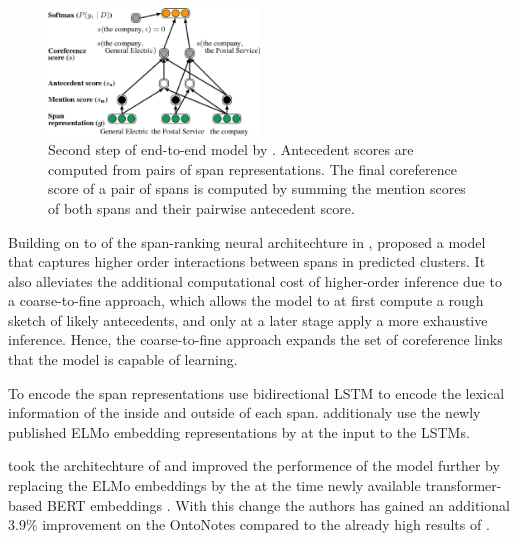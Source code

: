 \documentclass[11pt]{article}
\begin{document}
\begin{figure} %
    \centering
      \includegraphics[width=0.5\textwidth]{e2e_extra_info.eps}
  \caption{Second step of end-to-end model by \textcite{lee2017end}. Antecedent scores are computed from pairs of span representations. The final coreference score of a pair of spans is computed by summing the mention scores of both spans and their pairwise antecedent score.  }
  \label{fig:e2e_extra_infol}
\end{figure}

Building on to of the span-ranking neural architechture in \textcite{lee2017end}, \textcite{lee2018higher} proposed a model that captures higher order interactions
between spans in predicted clusters. It also alleviates the additional computational cost of higher-order inference due to a coarse-to-fine approach, which allows the model to at first compute a rough sketch of likely antecedents, and only at a later stage apply a more exhaustive inference. Hence, the coarse-to-fine approach expands the set of coreference links that the model is capable of learning. 

To encode the span representations \textcite{lee2017end} use bidirectional LSTM \parencite{lstm} to encode the lexical information of the inside and
outside of each span. \textcite{lee2018higher} additionaly use the newly published ELMo embedding representations by \textcite{peters2018elmo} at the input to the LSTMs.

\textcite{joshi2019coref} took the architechture of \textcite{lee2018higher} and improved the performence of the model further by replacing the ELMo embeddings by the at the time newly available transformer-based BERT embeddings \textcite{devlin2019bert}. With this change the  authors has gained an additional 3.9\% improvement on the OntoNotes compared to the already high results of \textcite{lee2018higher} . 





\end{document}

